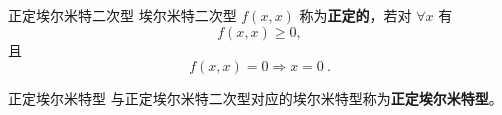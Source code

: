 \begin{definition}{正定埃尔米特二次型}
埃尔米特二次型 $f(   x,   x)$ 称为\textbf{正定的}，若对 $\forall    x$ 有
\begin{equation}
f(   x,   x)\geq0,
\end{equation}
且
\begin{equation}
f(   x,   x)=0\Rightarrow   x=   0~.
\end{equation}
\end{definition}
\begin{definition}{正定埃尔米特型}\label{def_HeFor_1}
与正定埃尔米特二次型对应的埃尔米特型称为\textbf{正定埃尔米特型}。
\end{definition}